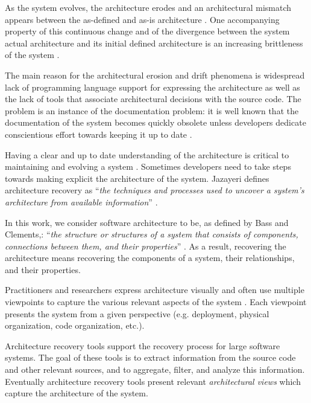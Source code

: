 \documentclass[preprint,12pt]{elsarticle}
\begin{document}
As the system evolves, the architecture erodes \cite{perry-foundations} and an architectural mismatch appears between the as-defined and as-is architecture \cite{garlan-mismatch}.
One accompanying property of this continuous change and of the divergence between the system actual architecture and its initial defined architecture is an increasing brittleness of the system \cite{perry-foundations}.

The main reason for the architectural erosion and drift phenomena is widespread lack of programming language support for expressing the architecture as well as the lack of tools that associate architectural decisions with the source code. The problem is an instance of the documentation problem: it is well known that the documentation of the system becomes quickly obsolete unless developers dedicate conscientious effort towards keeping it up to date \cite{riva-report}.

Having a clear and up to date understanding of the architecture is critical to maintaining and evolving a system \cite{pollet-sar}. Sometimes developers need to take steps towards making explicit the architecture of the system. Jazayeri defines architecture recovery as ``{\em the techniques and processes used to uncover a system’s architecture from available information}'' \cite{jaza-archevo}.


In this work, we consider software architecture to be, as defined by Bass and Clements,: ``{\em the structure or structures of a system that consists of components, connections between them, and their properties}'' \cite{bass-architecture}. 
As a result, recovering the architecture means recovering the components of a system, their relationships, and their properties. 

Practitioners and researchers express architecture visually and often use multiple viewpoints to capture the various relevant aspects of the system \cite{kruchten-4plus}. Each viewpoint presents the system from a given perspective (e.g. deployment, physical organization, code organization, etc.).


Architecture recovery tools support the recovery process for large software systems. The goal of these tools is to extract information from the source code and other relevant sources, and to aggregate, filter, and analyze this information. Eventually architecture recovery tools present relevant {\em architectural views} which capture the architecture of the system. 
\end{document}
